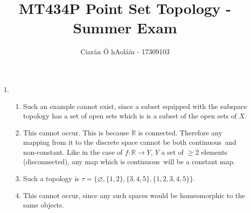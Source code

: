 \documentclass{article}
\title{MT434P Point Set Topology - Summer Exam}
\author{Ciarán Ó hAoláín - 17309103}
\newcommand{\R}{\mathbb{R}}
\newcommand{\cts}{continuous\ }
\renewcommand{\emptyset}{\varnothing}
\theoremstyle{remark}
\theoremstyle{example}
\theoremstyle{examples}
\begin{document}
\maketitle

\begin{enumerate}
	\item \begin{enumerate}
		      \item Such an example cannot exist, since a subset equipped with the subspace topology has a set of open sets which is is a subset of the open sets of $X$.
		      \item This cannot occur. This is because $\R$ is connected. Therefore any mapping from it to the discrete space cannot be both \cts and non-constant. Like in the case of $f:\R \to Y$, $Y$ a set of $\geq 2$ elements (disconnected), any map which is \cts will be a constant map.
		      \item Such a topology is $\tau=\{\emptyset, \{1,2\}, \{3,4,5\}, \{1,2,3,4,5\}\}$.
		      \item This cannot occur, since any such spaces would be homeomorphic to the same objects.


\end{enumerate}
\end{enumerate}
\end{document}
